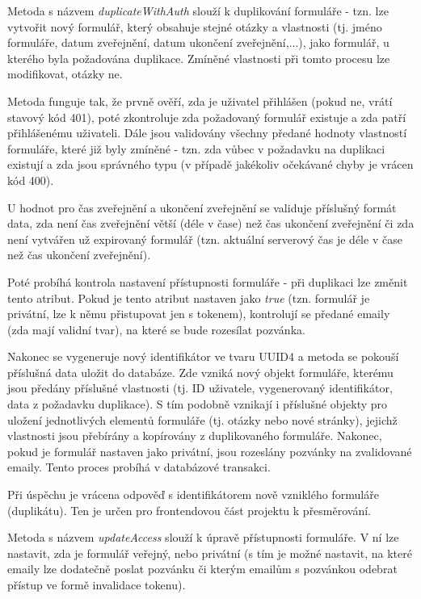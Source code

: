 			\label{sec:form_dupl}
			Metoda s názvem \textit{duplicateWithAuth} slouží k duplikování formuláře - tzn. lze vytvořit nový formulář, který obsahuje stejné otázky a vlastnosti (tj. jméno formuláře, datum zveřejnění, datum ukončení zveřejnění,...), jako formulář, u kterého byla požadována duplikace. Zmíněné vlastnosti při tomto procesu lze modifikovat, otázky ne.
			
			Metoda funguje tak, že prvně ověří, zda je uživatel přihlášen (pokud ne, vrátí stavový kód 401), poté zkontroluje zda požadovaný formulář existuje a zda patří přihlášenému uživateli. Dále jsou validovány všechny předané hodnoty vlastností formuláře, které již byly zmíněné - tzn. zda vůbec v požadavku na duplikaci existují a zda jsou správného typu (v případě jakékoliv očekávané chyby je vrácen kód 400). 
			
			U hodnot pro čas zveřejnění a ukončení zveřejnění se validuje příslušný formát data, zda není čas zveřejnění větší (déle v čase) než čas ukončení zveřejnění či zda není vytvářen už expirovaný formulář (tzn. aktuální serverový čas je déle v čase než čas ukončení zveřejnění). 
			
			Poté probíhá kontrola nastavení přístupnosti formuláře - při duplikaci lze změnit tento atribut. Pokud je tento atribut nastaven jako \textit{true} (tzn. formulář je privátní, lze k němu přistupovat jen s tokenem), kontrolují se předané emaily (zda mají validní tvar), na které se bude rozesílat pozvánka.
			
			Nakonec se vygeneruje nový identifikátor ve tvaru UUID4 a metoda se pokouší příslušná data uložit do databáze. Zde vzniká nový objekt formuláře, kterému jsou předány příslušné vlastnosti (tj. ID uživatele, vygenerovaný identifikátor, data z požadavku duplikace). S tím podobně vznikají i příslušné objekty pro uložení jednotlivých elementů formuláře (tj. otázky nebo nové stránky), jejichž vlastnosti jsou přebírány a kopírovány z duplikovaného formuláře. Nakonec, pokud je formulář nastaven jako privátní, jsou rozeslány pozvánky na zvalidované emaily. Tento proces probíhá v databázové transakci.
			
			Při úspěchu je vrácena odpověď s identifikátorem nově vzniklého formuláře (duplikátu). Ten je určen pro frontendovou část projektu k přesměrování.
								
			\label{sec:form_accessibility}
			Metoda s názvem \textit{updateAccess} slouží k úpravě přístupnosti formuláře. V ní lze nastavit, zda je formulář veřejný, nebo privátní (s tím je možné nastavit, na které emaily lze dodatečně poslat pozvánku či kterým emailům s pozvánkou odebrat přístup ve formě invalidace tokenu).
			
